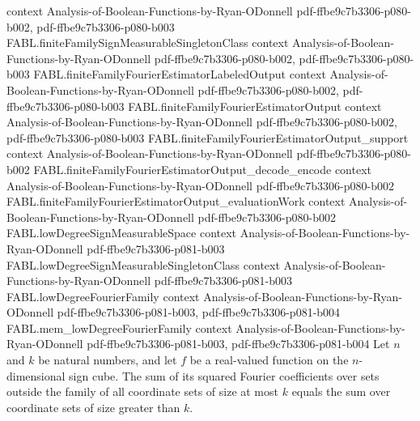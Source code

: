 \begin{theorem}
  {context}
  {Analysis-of-Boolean-Functions-by-Ryan-ODonnell}
  {pdf-ffbe9c7b3306-p080-b002,
    pdf-ffbe9c7b3306-p080-b003}
\proofstep
  {FABL.finiteFamilySignMeasurableSingletonClass}
  {context}
  {Analysis-of-Boolean-Functions-by-Ryan-ODonnell}
  {pdf-ffbe9c7b3306-p080-b002,
    pdf-ffbe9c7b3306-p080-b003}
\proofstep
  {FABL.finiteFamilyFourierEstimatorLabeledOutput}
  {context}
  {Analysis-of-Boolean-Functions-by-Ryan-ODonnell}
  {pdf-ffbe9c7b3306-p080-b002,
    pdf-ffbe9c7b3306-p080-b003}
\proofstep
  {FABL.finiteFamilyFourierEstimatorOutput}
  {context}
  {Analysis-of-Boolean-Functions-by-Ryan-ODonnell}
  {pdf-ffbe9c7b3306-p080-b002,
    pdf-ffbe9c7b3306-p080-b003}
\proofstep
  {FABL.finiteFamilyFourierEstimatorOutput_support}
  {context}
  {Analysis-of-Boolean-Functions-by-Ryan-ODonnell}
  {pdf-ffbe9c7b3306-p080-b002}
\proofstep
  {FABL.finiteFamilyFourierEstimatorOutput_decode_encode}
  {context}
  {Analysis-of-Boolean-Functions-by-Ryan-ODonnell}
  {pdf-ffbe9c7b3306-p080-b002}
\proofstep
  {FABL.finiteFamilyFourierEstimatorOutput_evaluationWork}
  {context}
  {Analysis-of-Boolean-Functions-by-Ryan-ODonnell}
  {pdf-ffbe9c7b3306-p080-b002}
\proofstep
  {FABL.lowDegreeSignMeasurableSpace}
  {context}
  {Analysis-of-Boolean-Functions-by-Ryan-ODonnell}
  {pdf-ffbe9c7b3306-p081-b003}
\proofstep
  {FABL.lowDegreeSignMeasurableSingletonClass}
  {context}
  {Analysis-of-Boolean-Functions-by-Ryan-ODonnell}
  {pdf-ffbe9c7b3306-p081-b003}
\proofstep
  {FABL.lowDegreeFourierFamily}
  {context}
  {Analysis-of-Boolean-Functions-by-Ryan-ODonnell}
  {pdf-ffbe9c7b3306-p081-b003,
    pdf-ffbe9c7b3306-p081-b004}
\proofstep
  {FABL.mem_lowDegreeFourierFamily}
  {context}
  {Analysis-of-Boolean-Functions-by-Ryan-ODonnell}
  {pdf-ffbe9c7b3306-p081-b003,
    pdf-ffbe9c7b3306-p081-b004}
Let $n$ and $k$ be natural numbers, and let $f$ be a real-valued function on the
$n$-dimensional sign cube. The sum of its squared Fourier coefficients over sets outside
the family of all coordinate sets of size at most $k$ equals the sum over coordinate
sets of size greater than $k$.
\end{theorem}

